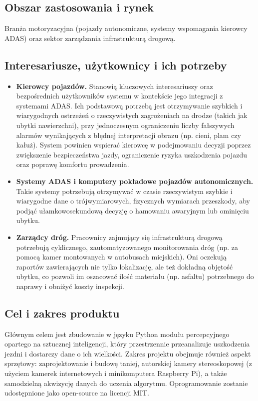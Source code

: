 \documentclass[11pt, a4paper]{article}
\begin{document}
\subsection{Obszar zastosowania i rynek}
Branża motoryzacyjna (pojazdy autonomiczne, systemy wspomagania kierowcy ADAS) oraz sektor zarządzania infrastrukturą drogową.

\subsection{Interesariusze, użytkownicy i ich potrzeby}
\begin{itemize}
    \item \textbf{Kierowcy pojazdów.} 
Stanowią kluczowych interesariuszy oraz bezpośrednich użytkowników systemu w kontekście jego integracji z systemami ADAS. Ich podstawową potrzebą jest otrzymywanie szybkich i wiarygodnych ostrzeżeń o rzeczywistych zagrożeniach na drodze (takich jak ubytki nawierzchni), przy jednoczesnym ograniczeniu liczby fałszywych alarmów wynikających z błędnej interpretacji obrazu (np. cieni, plam czy kałuż). System powinien wspierać kierowcę w podejmowaniu decyzji poprzez zwiększenie bezpieczeństwa jazdy, ograniczenie ryzyka uszkodzenia pojazdu oraz poprawę komfortu prowadzenia.
    \item \textbf{Systemy ADAS i komputery pokładowe pojazdów autonomicznych.} Takie systemy potrzebują otrzymywać w czasie rzeczywistym szybkie i wiarygodne dane o trójwymiarowych, fizycznych wymiarach przeszkody, aby podjąć ułamkowosekundową decyzję o hamowaniu awaryjnym lub ominięciu ubytku.
    \item \textbf{Zarządcy dróg.} Pracownicy zajmujący się infrastrukturą drogową potrzebują cyklicznego, zautomatyzowanego monitorowania dróg (np. za pomocą kamer montowanych w autobusach miejskich). Oni oczekują raportów zawierających nie tylko lokalizację, ale też dokładną objętość ubytku, co pozwoli im oszacować ilość materiału (np. asfaltu) potrzebnego do naprawy i obniżyć koszty inspekcji.

\end{itemize}

\subsection{Cel i zakres produktu}
Głównym celem jest zbudowanie w języku Python modułu percepcyjnego opartego na sztucznej inteligencji, który przestrzennie przeanalizuje uszkodzenia jezdni i dostarczy dane o ich wielkości. Zakres projektu obejmuje również aspekt sprzętowy: zaprojektowanie i budowę taniej, autorskiej kamery stereoskopowej (z użyciem kamerek internetowych i minikomputera Raspberry Pi), a także samodzielną akwizycję danych do uczenia algorytmu. Oprogramowanie zostanie udostępnione jako open-source na licencji MIT.
\end{document}
